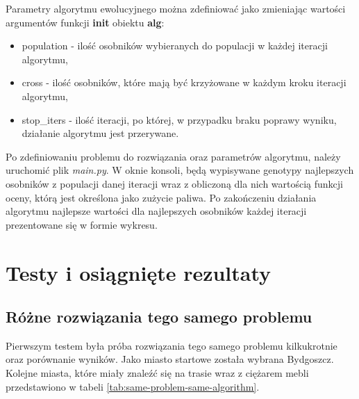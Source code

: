 \documentclass[12pt, oneside, final]{report}
\begin{document}
Parametry algorytmu ewolucyjnego można zdefiniować jako zmieniając wartości argumentów funkcji \textbf{init} obiektu \textbf{alg}:
\begin{itemize}
\item population - ilość osobników wybieranych do populacji w każdej iteracji algorytmu,
\item cross - ilość osobników, które mają być krzyżowane w każdym kroku iteracji algorytmu,
\item stop\_iters - ilość iteracji, po której, w przypadku braku poprawy wyniku, działanie algorytmu jest przerywane.
\end{itemize}

Po zdefiniowaniu problemu do rozwiązania oraz parametrów algorytmu, należy uruchomić plik \textit{main.py}. W oknie konsoli, będą wypisywane genotypy najlepszych osobników z populacji danej iteracji wraz z obliczoną dla nich wartością funkcji oceny, którą jest określona jako zużycie paliwa.
 Po zakończeniu działania algorytmu najlepsze wartości dla najlepszych osobników każdej iteracji prezentowane się w formie wykresu.

\chapter{Testy i osiągnięte rezultaty}

\section{Różne rozwiązania tego samego problemu}
Pierwszym testem była próba rozwiązania tego samego problemu kilkukrotnie oraz porównanie wyników. Jako miasto startowe została wybrana Bydgoszcz. Kolejne miasta, które miały znaleźć się na trasie wraz z ciężarem mebli przedstawiono w tabeli \ref{tab:same-problem-same-algorithm}.

\begin{table}[ht!]
\caption{Definicja problemu do rozwiązania w pierwszym teście}
\label{tab:same-problem-same-algorithm}
\centering
{}
\end{table}
\end{document}
